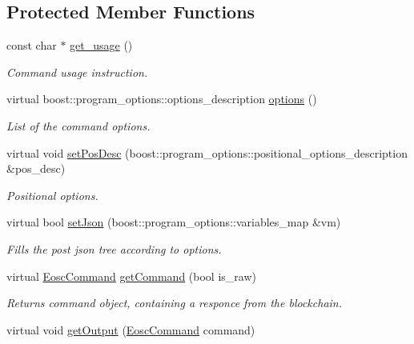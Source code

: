 \subsection*{Protected Member Functions}
\begin{DoxyCompactItemize}
\item 
const char $\ast$ \hyperlink{classtokenika_1_1eosc_1_1get__block_options_a339878f62e1d3a3215e0dbf13ba405bf}{get\+\_\+usage} ()
\begin{DoxyCompactList}\small\item\em Command \textquotesingle{}usage\textquotesingle{} instruction. \end{DoxyCompactList}\item 
virtual boost\+::program\+\_\+options\+::options\+\_\+description \hyperlink{classtokenika_1_1eosc_1_1get__block_options_a4071310fa888b0e7184648bd62e6eb41}{options} ()
\begin{DoxyCompactList}\small\item\em List of the command options. \end{DoxyCompactList}\item 
virtual void \hyperlink{classtokenika_1_1eosc_1_1get__block_options_ae4700d2d07381825120bed34148b76f0}{set\+Pos\+Desc} (boost\+::program\+\_\+options\+::positional\+\_\+options\+\_\+description \&pos\+\_\+desc)
\begin{DoxyCompactList}\small\item\em Positional options. \end{DoxyCompactList}\item 
virtual bool \hyperlink{classtokenika_1_1eosc_1_1get__block_options_acb69f3c1fb4dc9b86d070111602a69e0}{set\+Json} (boost\+::program\+\_\+options\+::variables\+\_\+map \&vm)
\begin{DoxyCompactList}\small\item\em Fills the post json tree according to options. \end{DoxyCompactList}\item 
virtual \hyperlink{classtokenika_1_1eosc_1_1_eosc_command}{Eosc\+Command} \hyperlink{classtokenika_1_1eosc_1_1get__block_options_a4945270fc48d5b3cc39b1af998a39dfc}{get\+Command} (bool is\+\_\+raw)
\begin{DoxyCompactList}\small\item\em Returns command object, containing a responce from the blockchain. \end{DoxyCompactList}\item 
virtual void \hyperlink{classtokenika_1_1eosc_1_1get__block_options_a58257ff6c0a7413dd1c8141ffe789d91}{get\+Output} (\hyperlink{classtokenika_1_1eosc_1_1_eosc_command}{Eosc\+Command} command)

\end{DoxyCompactItemize}

